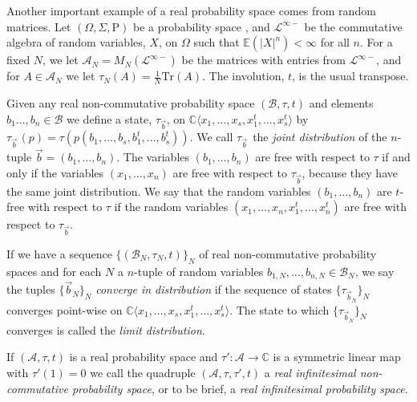 \documentclass[11pt]{amsart}
\theoremstyle{definition}
\numberwithin{theorem}{section}
\newcommand{\bC}{\mathbb{C}}
\newcommand{\cA}{\mathcal{A}}
\newcommand{\cB}{\mathcal{B}}
\newcommand{\cL}{\mathcal{L}}
\newcommand{\gO}{\Omega}
\newcommand{\gS}{\Sigma}
\newcommand{\sN}{{\scriptscriptstyle N}}
\newcommand{\sone}{{\scriptscriptstyle 1}}
\newcommand{\rE} {\mathbb{E}}
\newcommand{\rP}{\mathrm{P}}
\newcommand{\Tr}{\mathrm{Tr}}
\begin{document}
Another important example of a real probability space comes
from random matrices. Let $(\gO, \gS, \rP)$ be a probability
space , and $\cL^{\infty-}$ be the commutative algebra of
random variables, $X$, on $\gO$ such that $\rE(|X|^n) <
\infty$ for all $n$. For a fixed $N$, we let $\cA_\sN =
M_\sN(\cL^{\infty-})$ be the matrices with entries from
$\cL^{\infty-}$, and for $A \in \cA_\sN$ we let $\tau_\sN(A)
= \frac{\sone}{\sN} \Tr(A)$. The involution, $t$, is the
usual transpose.


Given any real non-commutative probability space $(\cB,
\tau, t)$ and elements $b_1 \dots , b_n \in \cB$ we define a
state, $\tau_{\vec b}$, on $\bC\langle x_1, \dots, x_s,
x_1^t, \dots, x_s^t\rangle$ by $\tau_{\vec b\, }(p) =
\tau(p(b_1, \dots, b_s, b_1^t, \dots, b_s^t))$. We call
$\tau_{\vec b\,}$ the \textit{joint distribution} of the
$n$-tuple $\vec b = (b_1, \dots, b_n)$. The variables $(b_1,
\dots, b_n)$ are free with respect to $\tau$ if and only if
the variables $(x_1, \dots, x_n)$ are free with respect to
$\tau_{\vec b}$, because they have the same joint
distribution. We say that the random variables $(b_1, \dots,
b_n)$ are $t$-free with respect to $\tau$ if the random
variables $(x_1, \dots, x_n, x_1^t, \dots, x_n^t)$ are free
with respect to $\tau_{\vec b}$.

If we have a sequence $\{(\cB_\sN, \tau_\sN, t)\}_\sN$ of
real non-commutative probability spaces and for each $N$ a
$n$-tuple of random variables $b_{1, \sN}, \dots, b_{n, \sN}
\in \cB_\sN$, we say the tuples $\{\vec {b}_\sN\}_\sN$
\textit{converge in distribution} if the sequence of states
$\{ \tau_{\vec{b}_\sN} \}_\sN$ converges point-wise on
$\bC\langle x_1, \dots, x_s, x_1^t, \dots,
x_s^t\rangle$. The state to which $\{ \tau_{\vec{b}_\sN}
\}_\sN$ converges is called the \textit{limit distribution}.


If $(\cA, \tau, t)$ is a real probability space and $\tau':
\cA \to \bC$ is a symmetric linear map with $\tau'(1) = 0$
we call the quadruple $(\cA, \tau, \tau', t)$ a \textit{real
  infinitesimal non-commutative probability space}, or to be
brief, a \textit{real infinitesimal probability space}.
\end{document}
